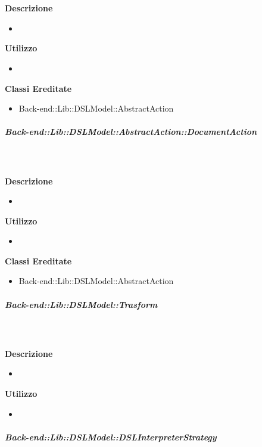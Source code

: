         \textbf{\\ \\ Descrizione} 
          \begin{itemize}
            \item[] 
          \end{itemize}      
        \textbf{Utilizzo}  
          \begin{itemize}
            \item[] 
          \end{itemize}
          \textbf{Classi Ereditate}
          \begin{itemize}
                \item{Back-end::Lib::DSLModel::AbstractAction}
          \end{itemize}
      \subparagraph{Back-end::Lib::DSLModel::AbstractAction::DocumentAction}
        
        \textbf{\\ \\ Descrizione} 
          \begin{itemize}
            \item[] 
          \end{itemize}      
        \textbf{Utilizzo}  
          \begin{itemize}
            \item[] 
          \end{itemize}
          \textbf{Classi Ereditate}
          \begin{itemize}
                \item{Back-end::Lib::DSLModel::AbstractAction}
          \end{itemize}
      \subparagraph{Back-end::Lib::DSLModel::Trasform}
        
        \textbf{\\ \\ Descrizione} 
          \begin{itemize}
            \item[] 
          \end{itemize}      
        \textbf{Utilizzo}  
          \begin{itemize}
            \item[] 
          \end{itemize}
      \subparagraph{Back-end::Lib::DSLModel::DSLInterpreterStrategy}
        
